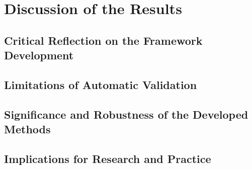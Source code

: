 \chapter{Discussion of the Results}
\label{chap:discussion}

\section{Critical Reflection on the Framework Development}

\section{Limitations of Automatic Validation}

\section{Significance and Robustness of the Developed Methods}
\section{Implications for Research and Practice}

